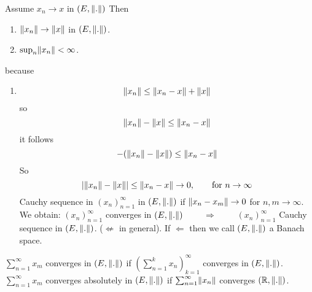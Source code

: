 \begin{bemerkung}
	Assume $x_n \to x$ in $(E,\norm{.})$ Then
	\begin{enumerate}[1)]
		\item $\norm{x_n} \to \norm{x}$ in $(E,\norm{.})$. 
		\item $\sup_{n} \norm{x_n} < \infty$.
	\end{enumerate}
	because
	\begin{enumerate}[1)]
		\item \[
			\norm{x_n} \leq \norm{x_n-x} + \norm{x}
		\]
		so
		\[
			\norm{x_n} - \norm{x} \leq \norm{x_n -x}
		\]
		it follows
		\[
			-(\norm{x_n}-\norm{x}) \leq \norm{x_n -x}
		\]
		So
		\[
			\abs{\norm{x_n}-\norm{x}} \leq \norm{x_n -x} \to 0, \qquad \text{for } n \to \infty
		\]
		Cauchy sequence in $(x_n)_{n=1}^{\infty}$ in $(E,\norm{.})$ if $\norm{x_n-x_m} \to 0$ for $n,m \to \infty$. \\
		We obtain:
	 	$(x_n)_{n=1}^{\infty}$ converges in $(E,\norm{.})$  $\qquad \Rightarrow \qquad$  $(x_n)_{n=1}^{\infty}$ Cauchy sequence in $(E,\norm{.})$. ($\not \Leftarrow $ in general).
		If $\Leftarrow$ then we call $(E,\norm{.})$ a Banach space. 
	\end{enumerate}
	$\sum_{n=1}^{\infty}x_m$ converges in $(E,\norm{.})$ if $\left( \sum_{n=1}^{k}x_n \right)_{k=1}^{\infty}$ converges in $(E,\norm{.})$. \\
	$\sum_{n=1}^{\infty}x_m$ converges absolutely in $(E,\norm{.})$ if $\sum_{n=1}^{\infty}\norm{x_n}$ converges $(\mathbb{R},\norm{.})$. \\
\end{bemerkung}

